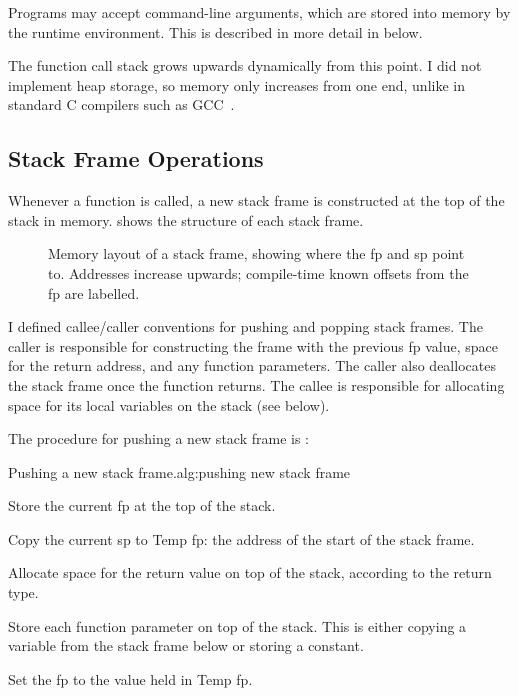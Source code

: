 \documentclass[00-main.tex]{subfiles}
\begin{document}
Programs may accept command-line arguments, which are stored into memory by the runtime environment.
This is described in more detail in  below.

The function call stack grows upwards dynamically from this point.
I did not implement heap storage, so memory only increases from one end, unlike in standard C compilers such as GCC~.

\subsection{Stack Frame Operations}

Whenever a function is called, a new stack frame is constructed at the top of the stack in memory.
 shows the structure of each stack frame.

\begin{figure}[!t]
  \centering
  \caption{\protect{}\protect{}%
    Memory layout of a stack frame, showing where the \gls{fp} and \gls{sp} point to.
    Addresses increase upwards; compile-time known offsets from the \gls{fp} are labelled.
  }%
  \label{fig:stack frame layout}
\end{figure}

I defined callee/caller conventions for pushing and popping stack frames.
The caller is responsible for constructing the frame with the previous \gls{fp} value, space for the return address, and any function parameters.
The caller also deallocates the stack frame once the function returns.
The callee is responsible for allocating space for its local variables on the stack (see  below).

The procedure for pushing a new stack frame is :

\begin{Algorithm}{Pushing a new stack frame.}{alg:pushing new stack frame}
\begin{EnumerateAlgorithm}
\item
Store the current \gls{fp} at the top of the stack.
\item
Copy the current \gls{sp} to Temp \gls{fp}: the address of the start of the stack frame.
\item
Allocate space for the return value on top of the stack, according to the return type.
\item
Store each function parameter on top of the stack.
This is either copying a variable from the stack frame below or storing a constant.
\item
Set the \gls{fp} to the value held in Temp \gls{fp}.
\end{EnumerateAlgorithm}
\end{Algorithm}
\end{document}
